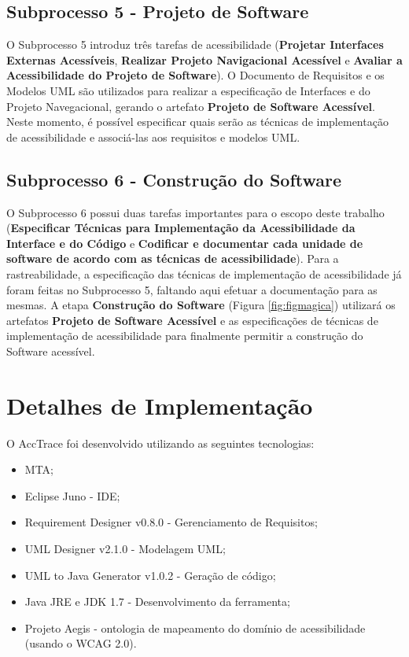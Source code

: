 \documentclass[runningheads,a4paper]{llncs}
\begin{document}
\subsection{Subprocesso 5 - Projeto de Software}

O Subprocesso 5 introduz três tarefas de acessibilidade (\textbf{Projetar
Interfaces Externas Acessíveis}, \textbf{Realizar Projeto Navigacional
Acessível} e \textbf{Avaliar a Acessibilidade do Projeto de Software}). O
Documento de Requisitos e os Modelos UML são utilizados para realizar a
especificação de Interfaces e do Projeto Navegacional, gerando o artefato
\textbf{Projeto de Software Acessível}. Neste momento, é possível especificar
quais serão as técnicas de implementação de acessibilidade e associá-las aos
requisitos e modelos UML.

\subsection{Subprocesso 6 - Construção do Software}

O Subprocesso 6 possui duas tarefas importantes para o escopo deste trabalho
(\textbf{Especificar Técnicas para Implementação da Acessibilidade da
Interface e do Código} e \textbf{Codificar e documentar cada unidade de software
de acordo com as técnicas de acessibilidade}). Para a rastreabilidade, a
especificação das técnicas de implementação de acessibilidade já foram feitas no
Subprocesso 5, faltando aqui efetuar a documentação para as mesmas. A etapa
\textbf{Construção do Software} (Figura \ref{fig:figmagica}) utilizará os
artefatos \textbf{Projeto de Software Acessível} e as especificações de técnicas
de implementação de acessibilidade para finalmente permitir a construção do
Software acessível.

\section{Detalhes de Implementação}

O AccTrace foi desenvolvido utilizando as seguintes tecnologias:

\begin{itemize}
  \item MTA;
  \item Eclipse Juno - IDE;
  \item Requirement Designer v0.8.0 - Gerenciamento de Requisitos;
  \item UML Designer v2.1.0 - Modelagem UML;
  \item UML to Java Generator v1.0.2 - Geração de código;
  \item Java JRE e JDK 1.7 - Desenvolvimento da ferramenta;
  \item Projeto Aegis - ontologia de mapeamento do domínio de acessibilidade (usando o WCAG 2.0).
\end{itemize}
\end{document}
